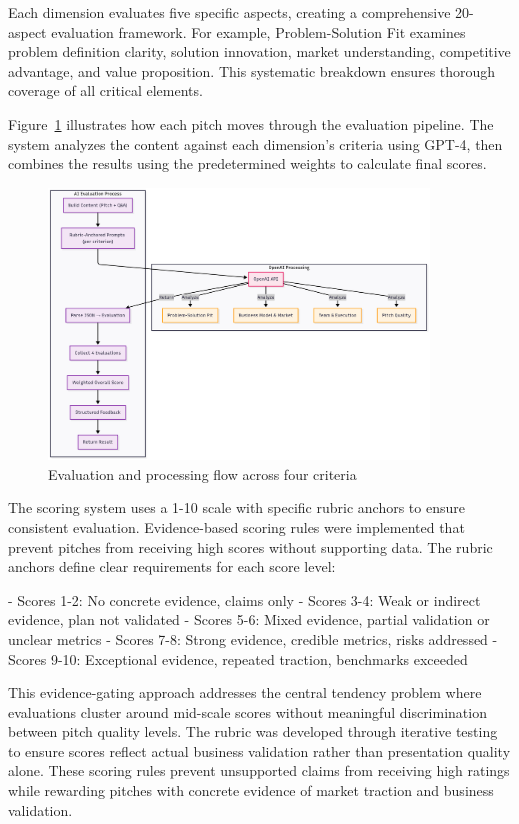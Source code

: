 Each dimension evaluates five specific aspects, creating a comprehensive 20-aspect evaluation framework. For example, Problem-Solution Fit examines problem definition clarity, solution innovation, market understanding, competitive advantage, and value proposition. This systematic breakdown ensures thorough coverage of all critical elements.

Figure~\ref{fig:eval-flow} illustrates how each pitch moves through the evaluation pipeline. The system analyzes the content against each dimension's criteria using GPT-4, then combines the results using the predetermined weights to calculate final scores.

\begin{figure}[H]
  \centering
  \includegraphics[width=0.9\textwidth]{img/eval-flow}
\caption{Evaluation and processing flow across four criteria}
  \label{fig:eval-flow}
\end{figure}

The scoring system uses a 1-10 scale with specific rubric anchors to ensure consistent evaluation. Evidence-based scoring rules were implemented that prevent pitches from receiving high scores without supporting data. The rubric anchors define clear requirements for each score level:

- Scores 1-2: No concrete evidence, claims only
- Scores 3-4: Weak or indirect evidence, plan not validated
- Scores 5-6: Mixed evidence, partial validation or unclear metrics
- Scores 7-8: Strong evidence, credible metrics, risks addressed
- Scores 9-10: Exceptional evidence, repeated traction, benchmarks exceeded

This evidence-gating approach addresses the central tendency problem where evaluations cluster around mid-scale scores without meaningful discrimination between pitch quality levels. The rubric was developed through iterative testing to ensure scores reflect actual business validation rather than presentation quality alone. These scoring rules prevent unsupported claims from receiving high ratings while rewarding pitches with concrete evidence of market traction and business validation.

